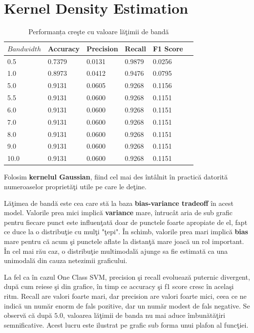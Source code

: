 \noindent
  

\section{Kernel Density Estimation}

\begin{table}[H]
  \centering
  \begin{tabularx}{\textwidth}{
      |X
      |X
      |X
      |X
      |X
      |X|
  }
  \hline
  $Bandwidth$ & {Accuracy} & {Precision} & {Recall} & {F1 Score} \\
  \hline
  \rowcolor{gray!20} 0.5 & 0.7379 & 0.0131 & 0.9879 & 0.0256 \\
  1.0 & 0.8973 & 0.0412 & 0.9476 & 0.0795 \\
  \rowcolor{gray!20} 5.0 & 0.9131 & 0.0605 & 0.9268 & 0.1156 \\
  5.5 & 0.9131 & 0.0600 & 0.9268 & 0.1151 \\
  \rowcolor{gray!20} 6.0 & 0.9131 & 0.0600 & 0.9268 & 0.1151 \\
  7.0 & 0.9131 & 0.0600 & 0.9268 & 0.1151 \\
  \rowcolor{gray!20} 8.0 & 0.9131 & 0.0600 & 0.9268 & 0.1151 \\
  9.0 & 0.9131 & 0.0600 & 0.9268 & 0.1151 \\
  \rowcolor{gray!20} 10.0 & 0.9131 & 0.0600 & 0.9268 & 0.1151 \\
  \hline
  \end{tabularx}
  \caption{Performanța creşte cu valoare lăţimii de bandă}
\end{table}

Folosim \textbf{kernelul Gaussian}, fiind cel mai des întâlnit în practică
datorită numeroaselor proprietăţi utile pe care le deţine.

Lăţimea de bandă este cea care stă la baza \textbf{bias-variance tradeoff} 
în acest model.
Valorile prea mici implică \textbf{variance} mare, întrucât aria de sub grafic 
pentru fiecare punct este influenţată doar de punctele foarte apropiate de el, 
fapt ce duce la o distribuţie cu mulţi "ţepi". 
În schimb, valorile prea mari implică \textbf{bias} mare pentru că acum şi punctele 
aflate la distanţă mare joacă un rol important. În cel mai rău caz, o distribuţie 
multimodală ajunge sa fie estimată ca una unimodală din cauza netezimii graficului.

La fel ca în cazul One Class SVM, precision şi recall evoluează puternic
divergent, după cum reiese şi din grafice, în timp ce accuracy şi f1 score cresc în acelaşi 
ritm. Recall are valori foarte mari, dar precision are valori foarte mici, ceea ce ne indică
un număr enorm de fals pozitive, dar un număr modest de fals negative.
Se observă că după $5.0$, valoarea lăţimii de banda nu mai aduce îmbunătăţiri 
semnificative. Acest lucru este ilustrat pe grafic sub forma unui plafon al funcţiei.

